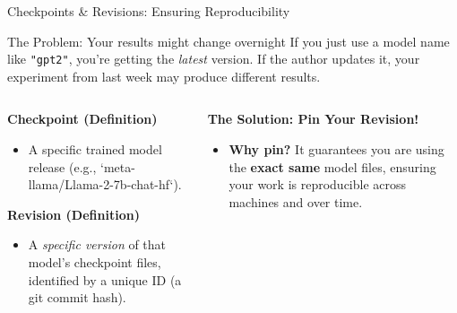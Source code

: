 \documentclass[aspectratio=169]{beamer}
\begin{document}
\begin{frame}{Checkpoints \& Revisions: Ensuring Reproducibility}
  \begin{block}{The Problem: Your results might change overnight}
    If you just use a model name like \texttt{"gpt2"}, you're getting the \emph{latest} version. If the author updates it, your experiment from last week may produce different results.
  \end{block}

  \begin{columns}[T]
    \begin{column}{0.5\linewidth}
      \textbf{Checkpoint (Definition)}
      \begin{itemize}
        \item A specific trained model release (e.g., `meta-llama/Llama-2-7b-chat-hf`).
      \end{itemize}
      
      \textbf{Revision (Definition)}
      \begin{itemize}
        \item A \emph{specific version} of that model's checkpoint files, identified by a unique ID (a git commit hash).
        \end{itemize}
    \end{column}
    \begin{column}{0.5\linewidth}
      \textbf{The Solution: Pin Your Revision!}
      \begin{itemize}
        \item \textbf{Why pin?} It guarantees you are using the \textbf{exact same} model files, ensuring your work is reproducible across machines and over time.
      \end{itemize}
    \end{column}
  \end{columns}
\end{frame}
\end{document}
